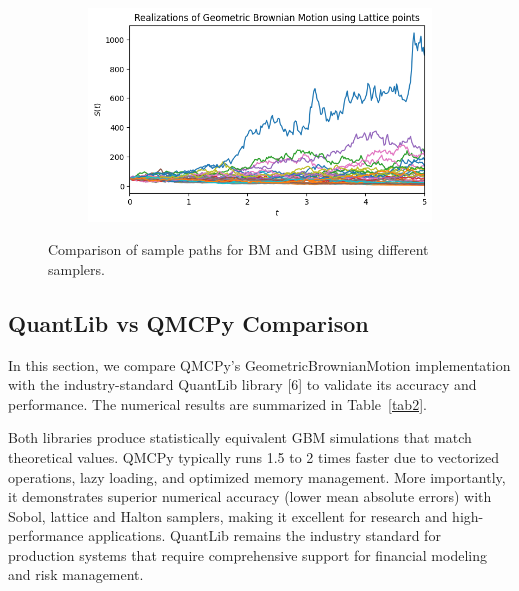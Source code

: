 \begin{figure}[tbp]
\begin{subfigure}[b]{0.49\textwidth}
\caption{}
\label{fig:bm_lattice}
\end{subfigure}
\hfill
\begin{subfigure}[b]{0.49\textwidth}
\includegraphics[width=\textwidth]{GBM/images/figure_4.png}
\caption{}
\label{fig:gbm_lattice}
\end{subfigure}
\caption{Comparison of sample paths for BM and GBM using different samplers.}
\label{fig:bm_gbm_paths}
\end{figure}

\subsection{QuantLib vs QMCPy Comparison}

In this section, we compare QMCPy's GeometricBrownianMotion implementation with the industry-standard QuantLib library [6] to validate its accuracy and performance. %
The numerical results are summarized in Table~\ref{tab2}. 

Both libraries produce statistically equivalent GBM simulations that match theoretical values. QMCPy typically runs 1.5 to 2 times faster due to vectorized operations, lazy loading, and optimized memory management. More importantly, it demonstrates superior numerical accuracy (lower mean absolute errors) with Sobol, lattice and Halton samplers, making it excellent for research and high-performance applications. QuantLib remains the industry standard for production systems that require comprehensive support for financial modeling and risk management.



